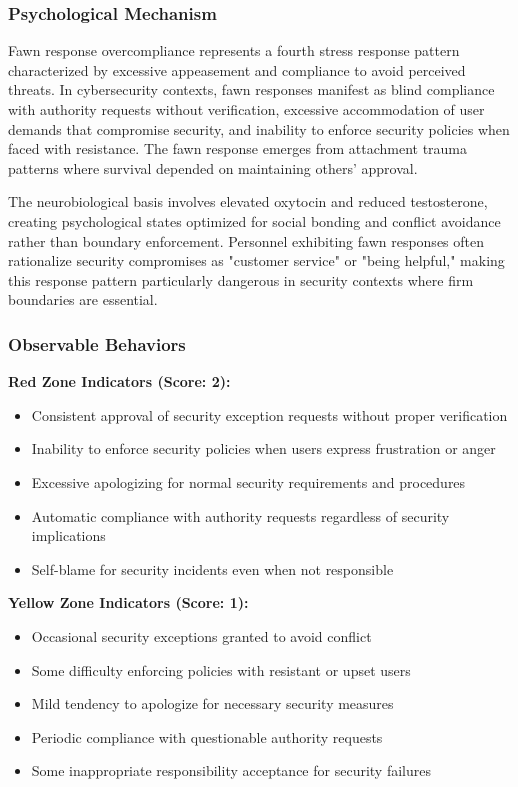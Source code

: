 \documentclass[11pt,a4paper]{article}
\begin{document}
\subsubsection{Psychological Mechanism}

Fawn response overcompliance represents a fourth stress response pattern characterized by excessive appeasement and compliance to avoid perceived threats\cite{walker2013}. In cybersecurity contexts, fawn responses manifest as blind compliance with authority requests without verification, excessive accommodation of user demands that compromise security, and inability to enforce security policies when faced with resistance. The fawn response emerges from attachment trauma patterns where survival depended on maintaining others' approval\cite{attachment2020}.

The neurobiological basis involves elevated oxytocin and reduced testosterone, creating psychological states optimized for social bonding and conflict avoidance rather than boundary enforcement\cite{neurobiological2021}. Personnel exhibiting fawn responses often rationalize security compromises as "customer service" or "being helpful," making this response pattern particularly dangerous in security contexts where firm boundaries are essential\cite{boundaries2022}.

\subsubsection{Observable Behaviors}

\textbf{Red Zone Indicators (Score: 2):}
\begin{itemize}
\item Consistent approval of security exception requests without proper verification
\item Inability to enforce security policies when users express frustration or anger
\item Excessive apologizing for normal security requirements and procedures
\item Automatic compliance with authority requests regardless of security implications
\item Self-blame for security incidents even when not responsible
\end{itemize}

\textbf{Yellow Zone Indicators (Score: 1):}
\begin{itemize}
\item Occasional security exceptions granted to avoid conflict
\item Some difficulty enforcing policies with resistant or upset users
\item Mild tendency to apologize for necessary security measures
\item Periodic compliance with questionable authority requests
\item Some inappropriate responsibility acceptance for security failures
\end{itemize}
\end{document}
